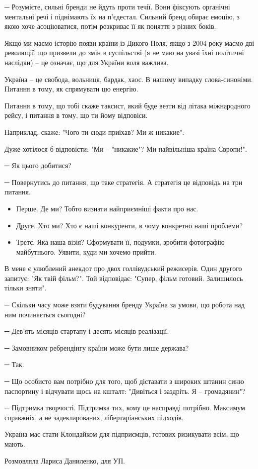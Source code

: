 ─ Розумієте, сильні бренди не йдуть проти течії. Вони фіксують органічні
ментальні речі і піднімають їх на п’єдестал. Сильний бренд обирає емоцію, з
якою хоче асоціюватися, потім розкриває її як поняття з різних боків.

Якщо ми маємо історію появи країни із Дикого Поля, якщо з 2004 року маємо дві
революції, що призвели до змін в суспільстві (я не маю на увазі їхні політичні
наслідки) – це означає, що для України воля важлива. 

Україна – це свобода, вольниця, бардак, хаос. В нашому випадку слова-синоніми.
Питання в тому, як спрямувати цю енергію. 

Питання в тому, що тобі скаже таксист, який буде везти від літака міжнародного
рейсу, і питання в тому, що ти йому відповіси.

Наприклад, скаже: "Чого ти сюди приїхав? Ми ж никакие".

Дуже хотілося б відповісти: "Ми – "никакие"? Ми найвільніша країна Європи!".

─ Як цього добитися?

─ Повернутись до питання, що таке стратегія. А стратегія це відповідь на три
питання.

\begin{itemize}
	\item Перше. Де ми? Тобто визнати найприємніші факти про нас.
	\item Друге. Хто ми? Хто є наші конкуренти, в чому конкретно наші проблеми?
	\item Третє. Яка наша візія? Сформувати її, подумки, зробити фотографію майбутнього. Уявити, куди ми хочемо прийти.
\end{itemize}

В мене є улюблений анекдот про двох голлівудський режисерів. Один другого
запитує: "Як твій фільм?". Той відповідає: "Супер, фільм готовий. Залишилось
тільки зняти".

─ Скільки часу може взяти будування бренду Україна за умови, що робота над ним
починається сьогодні?

─ Дев’ять місяців стартапу і десять місяців реалізації.

─ Замовником ребрендінгу країни може бути лише держава?

─ Так.

─ Що особисто вам потрібно для того, щоб діставати з широких штанин синю
паспортину і відчувати щось на кшталт: "Дивіться і заздріть. Я – громадянин"?

─ Підтримка творчості. Підтримка тих, кому це насправді потрібно. Максимум
справжніх, а не задекларованих, лібертаріанських підходів. 

Україна має стати Клондайком для підприємців, готових ризикувати всім, що
мають. 

Розмовляла Лариса Даниленко, для УП.
